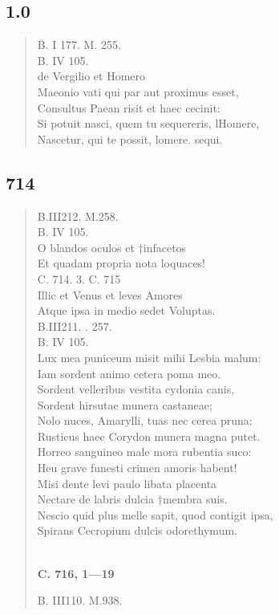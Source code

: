 \documentclass[11pt, a4paper]{report}
\begin{document}
            \subsection*{1.0}
      \begin{verse}
      B. I 177. M. 255. \\ B. IV 105. \\ de Vergilio et Homero \\ Maeonio vati qui par aut proximus esset, \\ Consultus Paean risit et haec cecinit: \\ Si potuit nasci, quem tu sequereris, lHomere, \\ Nascetur, qui te possit, lomere. sequi. \\ 
      \end{verse}
  
            \subsection*{714}
      \begin{verse}
      B.III212. M.258. \\ B. IV 105. \\ O blandos oculos et †infacetos \\ Et quadam propria nota loquaces! \\ 
        ﻿\pagebreak 
    C. 714. 3. C. 715 \\ Illic et Venus et leves Amores \\ Atque ipsa in medio sedet Voluptas. \\ B.III211. . 257. \\ B. IV 105. \\ Lux mea puniceum misit mihi Lesbia malum: \\ Iam sordent animo cetera poma meo. \\ Sordent velleribus vestita cydonia canis, \\ Sordent hirsutae munera castaneae; \\ Nolo nuces, Amarylli, tuas nec cerea pruna: \\ Rusticus haec Corydon munera magna putet. \\ Horreo sanguineo male mora rubentia suco: \\ Heu grave funesti crimen amoris habent! \\ Misi dente levi paulo libata placenta \\ Nectare de labris dulcia †membra suis. \\ Nescio quid plus melle sapit, quod contigit ipsa, \\ Spirans Cecropium dulcis odorethymum. \\ 
        ﻿\pagebreak 
     \marginpar{[179]} \begin{center} \textbf{C. 716, 1—19} \end{center}B. III110. M.938. \\ 
      \end{verse}
  
\end{document}

